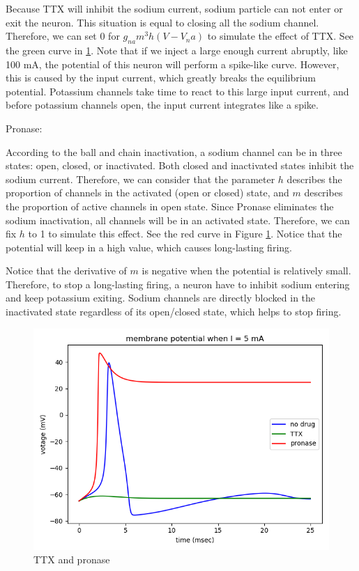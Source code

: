 \documentclass[11pt]{article}
\begin{document}
\begin{enumerate}
		Because TTX will inhibit the sodium current, sodium particle can not enter or exit the neuron. This situation is equal to closing all the sodium channel. Therefore, we can set 0 for $g_{na}m^3h(V-V_na)$ to simulate the effect of TTX. See the green curve in \ref{fig:fig5}. Note that if we inject a large enough current abruptly, like 100 mA, the potential of this neuron will perform a spike-like curve. However, this is caused by the input current, which greatly breaks the equilibrium potential. Potassium channels take time to react to this large input current, and before potassium channels open, the input current integrates like a spike.
		
		Pronase:
		
		According to the ball and chain inactivation, a sodium channel can be in three states: open, closed, or inactivated. Both closed and inactivated states inhibit the sodium current. Therefore, we can consider that the parameter $h$ describes the proportion of channels in the activated (open or closed) state, and $m$ describes the proportion of active channels in open state. Since Pronase eliminates the sodium inactivation, all channels will be in an activated state. Therefore, we can fix $h$ to 1 to simulate this effect. See the red curve in Figure \ref{fig:fig5}. Notice that the potential will keep in a high value, which causes long-lasting firing.
		
		Notice that the derivative of $m$ is negative when the potential is relatively small. Therefore, to stop a long-lasting firing, a neuron have to inhibit sodium entering and keep potassium exiting. Sodium channels are directly blocked in the inactivated state regardless of its open/closed state, which helps to stop firing.
		
		\begin{figure}[ht]
			\centering
			\includegraphics[scale=0.3]{plot_programming_7.png}
			\caption{TTX and pronase}
			\label{fig:fig5}
		\end{figure}
	\end{enumerate}
\end{document}
